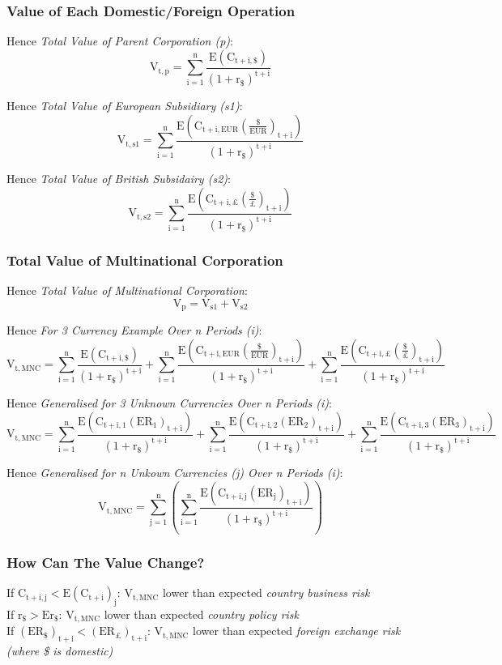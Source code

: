 \documentclass[11pt, english]{article}
\begin{document}
		\subsubsection{Value of Each Domestic/Foreign Operation}

	Hence \textit{Total Value of Parent Corporation (p)}:
	$$\mathrm{V_{t,p}=\sum_{i=1}^n\frac{E(C_{t+i,\$})}{(1+r_\$)^{t+i}}}$$

	Hence \textit{Total Value of European Subsidiary (s1)}:
	$$\mathrm{V_{t,s1}=\sum_{i=1}^n\frac{E\left(C_{t+i,EUR}\left(\frac{\$}{EUR}\right)_{t+i}\right)}{(1+r_\$)^{t+i}}}$$

	Hence \textit{Total Value of British Subsidairy (s2)}:
	$$\mathrm{V_{t,s2}=\sum_{i=1}^n\frac{E\left(C_{t+i,\pounds}\left(\frac{\$}{\pounds}\right)_{t+i}\right)}{(1+r_\$)^{t+i}}}$$

		\subsubsection{Total Value of Multinational Corporation}

	Hence \textit{Total Value of Multinational Corporation}:
	$$\mathrm{V_p=V_{s1}+V_{s2}}$$

	Hence \textit{For 3 Currency Example Over n Periods (i)}:
	$$\mathrm{V_{t,MNC}=\sum_{i=1}^n\frac{E(C_{t+i,\$})}{(1+r_\$)^{t+i}}+\sum_{i=1}^n\frac{E\left(C_{t+i,EUR}\left(\frac{\$}{EUR}\right)_{t+i}\right)}{(1+r_\$)^{t+i}}+\sum_{i=1}^n\frac{E\left(C_{t+i,\pounds}\left(\frac{\$}{\pounds}\right)_{t+i}\right)}{(1+r_\$)^{t+i}}}$$

	Hence \textit{Generalised for 3 Unknown Currencies Over n Periods (i)}:
	$$\mathrm{V_{t,MNC}=\sum_{i=1}^n\frac{E\left(C_{t+i,1}(ER_1)_{t+i}\right)}{(1+r_\$)^{t+i}}+\sum_{i=1}^n\frac{E\left(C_{t+i,2}(ER_2)_{t+i}\right)}{(1+r_\$)^{t+i}}+\sum_{i=1}^n\frac{E\left(C_{t+i,3}(ER_3)_{t+i}\right)}{(1+r_\$)^{t+i}}}$$

	Hence \textit{Generalised for n Unkown Currencies (j) Over n Periods (i)}: 
	$$\mathrm{V_{t,MNC}=\sum_{j=1}^n\left(\sum_{i=1}^n\frac{E\left(C_{t+i,j}(ER_j)_{t+i}\right)}{(1+r_\$)^{t+i}}\right)}$$

		\subsubsection{How Can The Value Change?}

	If $\mathrm{C_{t+i,j}<E(C_{t+i})_j}$: $\mathrm{V_{t,MNC}}$ lower than expected \textit{country business risk}\\
If $\mathrm{r_\$>E{r_\$}}$: $\mathrm{V_{t,MNC}}$ lower than expected \textit{country policy risk}\\
If $\mathrm{(ER_\$)_{t+i}<(ER_{\pounds})_{t+i}}$: $\mathrm{V_{t,MNC}}$ lower than expected \textit{foreign exchange risk (where \$ is domestic)}
\end{document}
